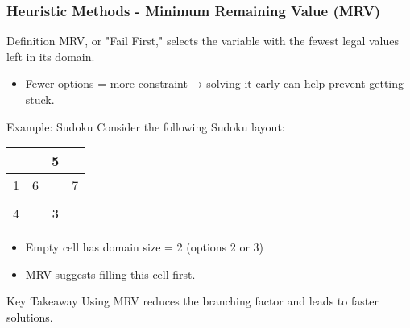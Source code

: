 \documentclass[aspectratio=169]{beamer}
\begin{document}
\begin{frame}[fragile]
    \frametitle{Heuristic Methods - Minimum Remaining Value (MRV)}
    \begin{block}{Definition}
        MRV, or "Fail First," selects the variable with the fewest legal values left in its domain.
    \end{block}
    
    \begin{itemize}
        \item Fewer options = more constraint → solving it early can help prevent getting stuck.
    \end{itemize}
    
    \begin{block}{Example: Sudoku}
        Consider the following Sudoku layout:
        \begin{center}
            \begin{tabular}{ |c|c|c|c| }
                \hline
                  &   & 5 &   \\
                \hline
                1 & 6 &   & 7 \\
                \hline
                  &   &   &   \\
                \hline
                4 &   & 3 &   \\
                \hline
            \end{tabular}
        \end{center}
        \begin{itemize}
            \item Empty cell has domain size = 2 (options 2 or 3)
            \item MRV suggests filling this cell first.
        \end{itemize}
    \end{block}

    \begin{block}{Key Takeaway}
        Using MRV reduces the branching factor and leads to faster solutions.
    \end{block}
\end{frame}
\end{document}
